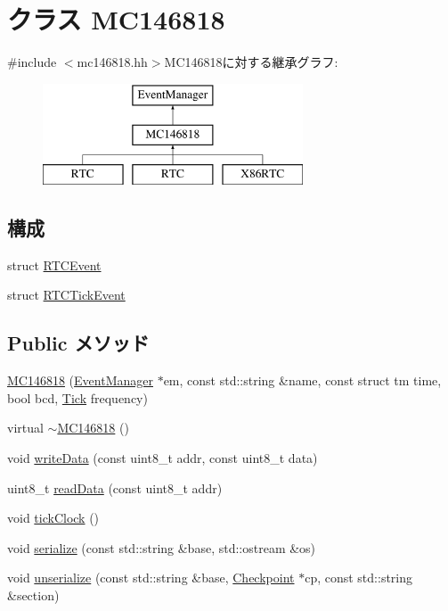 \hypertarget{classMC146818}{
\section{クラス MC146818}
\label{classMC146818}
}


{\ttfamily \#include $<$mc146818.hh$>$}MC146818に対する継承グラフ:\begin{figure}[H]
\begin{center}
\leavevmode
\includegraphics[height=3cm]{classMC146818}
\end{center}
\end{figure}
\subsection*{構成}
\begin{DoxyCompactItemize}
\item 
struct \hyperlink{structMC146818_1_1RTCEvent}{RTCEvent}
\item 
struct \hyperlink{structMC146818_1_1RTCTickEvent}{RTCTickEvent}
\end{DoxyCompactItemize}
\subsection*{Public メソッド}
\begin{DoxyCompactItemize}
\item 
\hyperlink{classMC146818_a281b3c32232ad842ca99d76d81907f0d}{MC146818} (\hyperlink{classEventManager}{EventManager} $\ast$em, const std::string \&name, const struct tm time, bool bcd, \hyperlink{base_2types_8hh_a5c8ed81b7d238c9083e1037ba6d61643}{Tick} frequency)
\item 
virtual \hyperlink{classMC146818_a9b8c835ca258cba33b1c311acd73c664}{$\sim$MC146818} ()
\item 
void \hyperlink{classMC146818_a0322692b645738d2f01925d065dcab62}{writeData} (const uint8\_\-t addr, const uint8\_\-t data)
\item 
uint8\_\-t \hyperlink{classMC146818_a7190f8b918c6a32feff80f288faa50c2}{readData} (const uint8\_\-t addr)
\item 
void \hyperlink{classMC146818_a56fef941f638fcd7eb6c44ed7817bb24}{tickClock} ()
\item 
void \hyperlink{classMC146818_ab4138b21b48e3371a8e20df72b675a88}{serialize} (const std::string \&base, std::ostream \&os)
\item 
void \hyperlink{classMC146818_a147c320e3d6506edf5587a40cd8e430d}{unserialize} (const std::string \&base, \hyperlink{classCheckpoint}{Checkpoint} $\ast$cp, const std::string \&section)
\end{DoxyCompactItemize}
